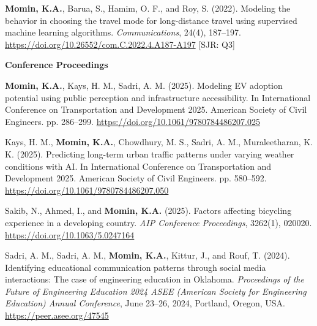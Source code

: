 \documentclass[a4paper,11pt]{article}
\begin{document}
\begin{enumerate}[leftmargin=*, labelsep=0em, align=left, widest={[\textbf{J.10}]}, itemindent=0em, label={\textbf{[J.\arabic*]}}]
\begin{justifying}
    \item \textbf{Momin, K.A.}, Barua, S., Hamim, O. F., and Roy, S. (2022). Modeling the behavior in choosing the travel mode for long-distance travel using supervised machine learning algorithms. \textit{Communications}, 24(4), 187–197. \href{https://doi.org/10.26552/com.C.2022.4.A187-A197}{https://doi.org/10.26552/com.C.2022.4.A187-A197} \hfill [\textcolor{mycolor}{SJR: Q3}]
  
\end{justifying}
\end{enumerate}

\vspace{2mm}
\textcolor{mycolor}{\textbf{Conference Proceedings }}

\begin{enumerate}[leftmargin=*, labelsep=0em, align=left, widest={[\textbf{C.10}]}, itemindent=0em, label={\textbf{[C.\arabic*]}}]

\begin{justifying}

\item \textbf{Momin, K.A.}, Kays, H. M., Sadri, A. M. (2025). Modeling EV adoption potential using public perception and infrastructure accessibility. In International Conference on Transportation and Development 2025. American Society of Civil Engineers. pp. 286–299. \href{https://doi.org/10.1061/9780784486207.025}{https://doi.org/10.1061/9780784486207.025}


\item Kays, H. M., \textbf{Momin, K.A.}, Chowdhury, M. S., Sadri, A. M., Muraleetharan, K. K. (2025). Predicting long-term urban traffic patterns under varying weather conditions with AI. In International Conference on Transportation and Development 2025. American Society of Civil Engineers. pp. 580–592. \href{https://doi.org/10.1061/9780784486207.050}{https://doi.org/10.1061/9780784486207.050}


\item Sakib, N., Ahmed, I., and \textbf{Momin, K.A.} (2025). Factors affecting bicycling experience in a developing country. \textit{AIP Conference Proceedings}, 3262(1), 020020. \href{https://doi.org/10.1063/5.0247164}{https://doi.org/10.1063/5.0247164}

\item Sadri, A. M., Sadri, A. M., \textbf{Momin, K.A.}, Kittur, J., and Rouf, T. (2024). Identifying educational communication patterns through social media interactions: The case of engineering education in Oklahoma. \textit{Proceedings of the Future of Engineering Education 2024 ASEE (American Society for Engineering Education) Annual Conference}, June 23–26, 2024, Portland, Oregon, USA. \href{https://peer.asee.org/47545}{https://peer.asee.org/47545}


\end{justifying}
\end{enumerate}
\end{document}
